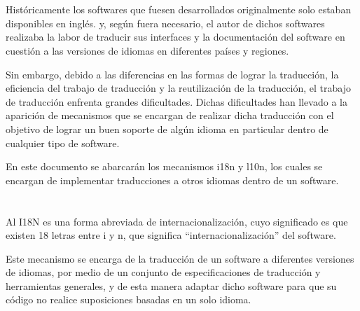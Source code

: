 \documentclass[10pt,a4paper]{article} %
\begin{document}
\section{}%
{\large Hist{\' o}ricamente los softwares que fuesen desarrollados originalmente solo estaban disponibles en ingl{\' e}s. y, seg{\' u}n fuera necesario, el autor de dichos softwares realizaba la labor de traducir sus interfaces y la documentaci{\' o}n del software en cuesti{\' o}n a las versiones de idiomas en diferentes pa{\' i}ses y regiones.   


\vspace{0.5cm}
Sin embargo, debido a las diferencias en las formas de lograr la traducci{\' o}n, la eficiencia del trabajo de traducci{\' o}n y la reutilizaci{\' o}n de la traducci{\' o}n, el trabajo de traducci{\' o}n enfrenta grandes dificultades. Dichas dificultades han llevado a la aparici{\' o}n de mecanismos que se encargan de realizar dicha traducci{\' o}n con el objetivo de lograr   un buen soporte de alg{\' u}n idioma en particular dentro de cualquier tipo de software. 


\vspace{0.5cm}
En este documento se abarcar{\' a}n los mecanismos i18n y l10n, los cuales se encargan de implementar traducciones a otros idiomas dentro de un software.}

\pagebreak

\section{\color{colorIPN}{Desarrollo}}

\subsection{\color{colorESCOM}{I18n}}
{\large Al I18N es una forma abreviada de internacionalizaci{\' o}n, cuyo significado es que existen 18 letras entre i y n, que significa ``internacionalizaci{\' o}n'' del software.


\vspace{0.5cm}
Este mecanismo se encarga de la traducci{\' o}n de un software a diferentes versiones de idiomas, por medio de un conjunto de especificaciones de traducci{\' o}n y herramientas generales, y de esta manera adaptar dicho software para que su c{\' o}digo no realice suposiciones basadas en un solo idioma.
}
\end{document}
